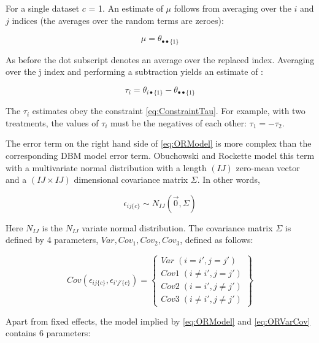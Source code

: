 \documentclass[
]{book}
\begin{document}
For a single dataset \(c\) = 1. An estimate of \(\mu\) follows from averaging over the \(i\) and \(j\) indices (the averages over the random terms are zeroes):

\begin{equation}
\mu = \theta_{\bullet \bullet \{1\}}
\label{eq:ORmuEstimate}
\end{equation}

As before the dot subscript denotes an average over the replaced index. Averaging over the j index and performing a subtraction yields an estimate of :

\begin{equation}
\tau_i = \theta_{i \bullet \{1\}} - \theta_{\bullet \bullet \{1\}}
\label{eq:ORtauEstimate}
\end{equation}

The \(\tau_i\) estimates obey the constraint \eqref{eq:ConstraintTau}. For example, with two treatments, the values of \(\tau_i\) must be the negatives of each other: \(\tau_1=-\tau_2\).

The error term on the right hand side of \eqref{eq:ORModel} is more complex than the corresponding DBM model error term. Obuchowski and Rockette model this term with a multivariate normal distribution with a length \((IJ)\) zero-mean vector and a \((IJ \times IJ)\) dimensional covariance matrix \(\Sigma\). In other words,

\begin{equation}
\epsilon_{ij\{c\}} \sim N_{IJ}(\vec{0},\Sigma)
\label{eq:OREpsSampling}
\end{equation}

Here \(N_{IJ}\) is the \(N_{IJ}\) variate normal distribution. The covariance matrix \(\Sigma\) is defined by 4 parameters, \(Var, Cov_1, Cov_2, Cov_3\), defined as follows:

\begin{equation}
Cov(\epsilon_{ij\{c\}},\epsilon_{i'j'\{c\}}) =
\left\{\begin{matrix}
Var \; (i=i',j=j') \\
Cov1 \; (i\ne i',j=j')\\ 
Cov2 \; (i = i',j \ne j')\\ 
Cov3 \; (i\ne i',j \ne j')
\end{matrix}\right\}
\label{eq:ORVarCov}
\end{equation}

Apart from fixed effects, the model implied by \eqref{eq:ORModel} and \eqref{eq:ORVarCov} contains 6 parameters:
\end{document}
